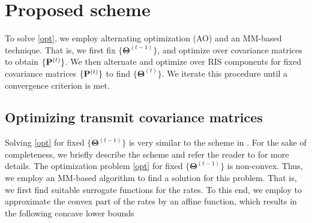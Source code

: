\documentclass[a4, conference]{IEEEtran}
\theoremstyle{definition}
\begin{document}
\section{Proposed scheme}
To solve \eqref{opt}, we employ alternating optimization (AO) and  an MM-based technique. 
That is, we first fix $\{\bm{\Theta}^{(t-1)}\}$, and optimize over covariance matrices to obtain $\{{\bf P}^{(t)}\}$. We then alternate and optimize over RIS components for fixed covariance matrices $\{{\bf P}^{(t)}\}$ to find $\{\bm{\Theta}^{(t)}\}$. We iterate this procedure until a convergence criterion is met. 


\subsection{Optimizing transmit covariance matrices}
Solving \eqref{opt} for fixed $\{\bm{\Theta}^{(t-1)}\}$ is very similar to the scheme in \cite[Sec. III.A]{soleymani2022noma}. For the sake of completeness, we briefly describe the scheme and refer the reader to \cite{soleymani2022noma} for more details.
The optimization problem \eqref{opt} for fixed $\{\bm{\Theta}^{(t-1)}\}$ is non-convex. Thus, we employ an MM-based algorithm to find a solution for  this problem. That is, we first find suitable surrogate functions for the rates. To this end, we employ 
\cite[Lemma 3]{soleymani2022rate} to approximate the convex part of the rates by an affine function, which results in the following concave lower bounds
\end{document}
